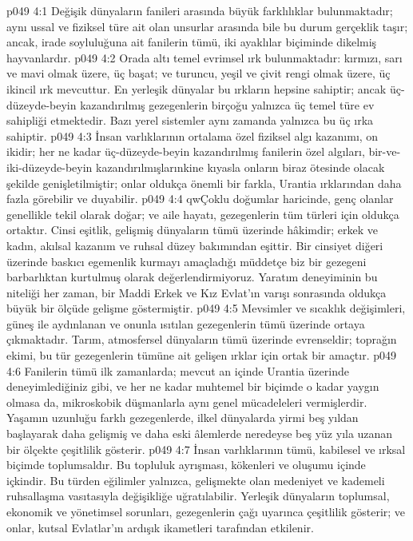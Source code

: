 \vs p049 4:1 Değişik dünyaların fanileri arasında büyük farklılıklar bulunmaktadır; aynı ussal ve fiziksel türe ait olan unsurlar arasında bile bu durum gerçeklik taşır; ancak, irade soyluluğuna ait fanilerin tümü, iki ayaklılar biçiminde dikelmiş hayvanlardır.
\vs p049 4:2 Orada altı temel evrimsel ırk bulunmaktadır: kırmızı, sarı ve mavi olmak üzere, üç başat; ve turuncu, yeşil ve çivit rengi olmak üzere, üç ikincil ırk mevcuttur. En yerleşik dünyalar bu ırkların hepsine sahiptir; ancak üç\hyp{}düzeyde\hyp{}beyin kazandırılmış gezegenlerin birçoğu yalnızca üç temel türe ev sahipliği etmektedir. Bazı yerel sistemler aynı zamanda yalnızca bu üç ırka sahiptir.
\vs p049 4:3 İnsan varlıklarının ortalama özel fiziksel algı kazanımı, on ikidir; her ne kadar üç\hyp{}düzeyde\hyp{}beyin kazandırılmış fanilerin özel algıları, bir\hyp{}ve\hyp{}iki\hyp{}düzeyde\hyp{}beyin kazandırılmışlarınkine kıyasla onların biraz ötesinde olacak şekilde genişletilmiştir; onlar oldukça önemli bir farkla, Urantia ırklarından daha fazla görebilir ve duyabilir.
\vs p049 4:4 qwÇoklu doğumlar haricinde, genç olanlar genellikle tekil olarak doğar; ve aile hayatı, gezegenlerin tüm türleri için oldukça ortaktır. Cinsi eşitlik, gelişmiş dünyaların tümü üzerinde hâkimdir; erkek ve kadın, akılsal kazanım ve ruhsal düzey bakımından eşittir. Bir cinsiyet diğeri üzerinde baskıcı egemenlik kurmayı amaçladığı müddetçe biz bir gezegeni barbarlıktan kurtulmuş olarak değerlendirmiyoruz. Yaratım deneyiminin bu niteliği her zaman, bir Maddi Erkek ve Kız Evlat’ın varışı sonrasında oldukça büyük bir ölçüde gelişme göstermiştir.
\vs p049 4:5 Mevsimler ve sıcaklık değişimleri, güneş ile aydınlanan ve onunla ısıtılan gezegenlerin tümü üzerinde ortaya çıkmaktadır. Tarım, atmosfersel dünyaların tümü üzerinde evrenseldir; toprağın ekimi, bu tür gezegenlerin tümüne ait gelişen ırklar için ortak bir amaçtır.
\vs p049 4:6 Fanilerin tümü ilk zamanlarda; mevcut an içinde Urantia üzerinde deneyimlediğiniz gibi, ve her ne kadar muhtemel bir biçimde o kadar yaygın olmasa da, mikroskobik düşmanlarla aynı genel mücadeleleri vermişlerdir. Yaşamın uzunluğu farklı gezegenlerde, ilkel dünyalarda yirmi beş yıldan başlayarak daha gelişmiş ve daha eski âlemlerde neredeyse beş yüz yıla uzanan bir ölçekte çeşitlilik gösterir.
\vs p049 4:7 İnsan varlıklarının tümü, kabilesel ve ırksal biçimde toplumsaldır. Bu topluluk ayrışması, kökenleri ve oluşumu içinde içkindir. Bu türden eğilimler yalnızca, gelişmekte olan medeniyet ve kademeli ruhsallaşma vasıtasıyla değişikliğe uğratılabilir. Yerleşik dünyaların toplumsal, ekonomik ve yönetimsel sorunları, gezegenlerin çağı uyarınca çeşitlilik gösterir; ve onlar, kutsal Evlatlar’ın ardışık ikametleri tarafından etkilenir.
